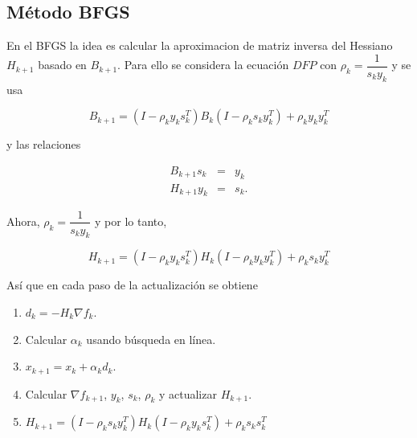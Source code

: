 \documentclass[11pt,letterpaper]{article}
\theoremstyle{definition}
\theoremstyle{definition}
\theoremstyle{definition}
\begin{document}
\subsection{Método BFGS}
En el BFGS la idea es calcular la aproximacion de matriz inversa del Hessiano $ H_{k+1} $ basado en $ B_{k+1} $.
Para ello se considera la ecuación $ DFP $ con $ \rho_k = \dfrac{1}{s_k y_k} $
y se usa
\begin{shaded*}
	\begin{equation*}
		B_{k+1} = (I - \rho_k y_k s_k^T) B_k ( I - \rho_k s_k y_k^T) + \rho_k y_k y_k^T
	\end{equation*}
\end{shaded*}
y las relaciones
\begin{shaded*}
	\begin{eqnarray*}
		B_{k+1} s_k & = & y_k \\
		H_{k+1} y_k & = & s_k.
	\end{eqnarray*}
\end{shaded*}
Ahora, $ \rho_k = \dfrac{1}{s_k y_k} $ y por lo tanto,
\begin{shaded*}
	\begin{equation*}
		H_{k+1} = (I - \rho_k y_k s_k^T) H_k ( I - \rho_k y_k y_k^T) + \rho_k s_k y_k^T
	\end{equation*}
\end{shaded*}
Así que en cada paso de la actualización se obtiene
\begin{enumerate}
	\item $ d_k = - H_k \nabla f_k $.
	\item Calcular $ \alpha_k $ usando búsqueda en línea.
	\item $ x_{k+1} = x_k + \alpha_k d_k $.
	\item Calcular $ \nabla f_{k+1} $, $ y_k $, $ s_k $, $ \rho_k $ y actualizar $ H_{k+1} $.
	\item $ H_{k+1} = (I - \rho_k s_k y_k^T) H_k (I - \rho_k y_k s_k^T) + \rho_k s_k s_k^T $
\end{enumerate}
\end{document}
